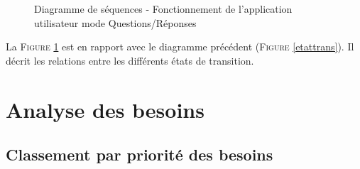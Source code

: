 \documentclass[a4paper,twoside,10pt]{report}
\begin{document}
  \begin{figure}[h]
  \begin{center}
   \caption{Diagramme de séquences - Fonctionnement de l’application utilisateur mode Questions/Réponses}
   \label{sequence} 
  \end{center}
  \end{figure}
  
  La \textsc{Figure} \ref{sequence} est en rapport avec le diagramme précédent (\textsc{Figure} \ref{etattrans}). Il décrit les relations entre les différents états de transition.
  

\chapter{Analyse des besoins}\label{besoins}

\section{Classement par priorité des besoins}\label{priorite}
\end{document}
